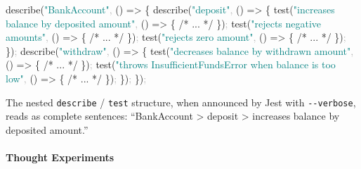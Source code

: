 \documentclass[
  justified,
  openright,
]{tufte-book}
\let\paragraph\paragraph
\newcommand{\CommentTok}[1]{\textcolor{MidGray}{#1}}
\newcommand{\FunctionTok}[1]{\textcolor{BrandBlue}{#1}}
\newcommand{\KeywordTok}[1]{\textcolor{BrandBlue}{#1}}
\newcommand{\NormalTok}[1]{#1}
\newcommand{\OperatorTok}[1]{\textcolor{DarkGray}{#1}}
\newcommand{\StringTok}[1]{\textcolor{Teal}{#1}}
\newenvironment{Shaded}{%
  \begin{snugshade}
}{%
  \end{snugshade}
}
\let\paragraph\paragraph
\begin{document}
\begin{Shaded}
\begin{Highlighting}[]
\FunctionTok{describe}\NormalTok{(}\StringTok{"BankAccount"}\OperatorTok{,}\NormalTok{ () }\KeywordTok{=\textgreater{}}\NormalTok{ \{}
  \FunctionTok{describe}\NormalTok{(}\StringTok{"deposit"}\OperatorTok{,}\NormalTok{ () }\KeywordTok{=\textgreater{}}\NormalTok{ \{}
    \FunctionTok{test}\NormalTok{(}\StringTok{"increases balance by deposited amount"}\OperatorTok{,}\NormalTok{ () }\KeywordTok{=\textgreater{}}\NormalTok{ \{}
      \CommentTok{/* ... */}
\NormalTok{    \})}\OperatorTok{;}
    \FunctionTok{test}\NormalTok{(}\StringTok{"rejects negative amounts"}\OperatorTok{,}\NormalTok{ () }\KeywordTok{=\textgreater{}}\NormalTok{ \{}
      \CommentTok{/* ... */}
\NormalTok{    \})}\OperatorTok{;}
    \FunctionTok{test}\NormalTok{(}\StringTok{"rejects zero amount"}\OperatorTok{,}\NormalTok{ () }\KeywordTok{=\textgreater{}}\NormalTok{ \{}
      \CommentTok{/* ... */}
\NormalTok{    \})}\OperatorTok{;}
\NormalTok{  \})}\OperatorTok{;}
  \FunctionTok{describe}\NormalTok{(}\StringTok{"withdraw"}\OperatorTok{,}\NormalTok{ () }\KeywordTok{=\textgreater{}}\NormalTok{ \{}
    \FunctionTok{test}\NormalTok{(}\StringTok{"decreases balance by withdrawn amount"}\OperatorTok{,}\NormalTok{ () }\KeywordTok{=\textgreater{}}\NormalTok{ \{}
      \CommentTok{/* ... */}
\NormalTok{    \})}\OperatorTok{;}
    \FunctionTok{test}\NormalTok{(}\StringTok{"throws InsufficientFundsError when balance is too low"}\OperatorTok{,}\NormalTok{ () }\KeywordTok{=\textgreater{}}\NormalTok{ \{}
      \CommentTok{/* ... */}
\NormalTok{    \})}\OperatorTok{;}
\NormalTok{  \})}\OperatorTok{;}
\NormalTok{\})}\OperatorTok{;}
\end{Highlighting}
\end{Shaded}

The nested \texttt{describe} / \texttt{test} structure, when announced
by Jest with \texttt{-\/-verbose}, reads as complete sentences:
``BankAccount \textgreater{} deposit \textgreater{} increases balance by
deposited amount.''

\paragraph{Thought Experiments}\label{thought-experiments-10}
\end{document}
